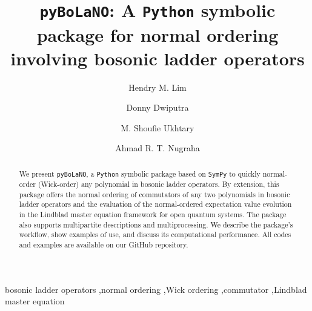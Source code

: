 \documentclass[5p, twocolumn, 10pt, sort&compress]{elsarticle}
\newcounter{bla}
\begin{document}
\sloppy

\begin{frontmatter}

\title{\texttt{pyBoLaNO}: A \texttt{Python} symbolic package for normal ordering involving bosonic ladder operators}

\author[a,b]{Hendry M. Lim}
\author[c,a]{Donny Dwiputra}
\author[a]{M. Shoufie Ukhtary}
\author[a,d]{Ahmad R. T. Nugraha}

\address[a]{Research Center for Quantum Physics, National Research and Innovation Agency (BRIN), South Tangerang 15314, Indonesia}
\address[b]{Department of Physics, Faculty of Mathematics and Natural Sciences, Universitas Indonesia, Depok 16424, Indonesia}
\address[c]{Asia Pacific Center for Theoretical Physics, Pohang 37673, Korea}
\address[d]{Department of Engineering Physics, Telkom University, Bandung 40257, Indonesia}


\begin{abstract}
We present \texttt{pyBoLaNO}, a \texttt{Python} symbolic package based on \texttt{SymPy} to quickly normal-order (Wick-order) any polynomial in bosonic ladder operators. By extension, this package offers the normal ordering of commutators of any two polynomials in bosonic ladder operators and the evaluation of the normal-ordered expectation value evolution in the Lindblad master equation framework for open quantum systems. The package also supports multipartite descriptions and multiprocessing. We describe the package's workflow, show examples of use, and discuss its computational performance. All codes and examples are available on our GitHub repository.
\end{abstract}


\begin{keyword}
bosonic ladder operators \sep normal ordering \sep Wick ordering \sep commutator \sep Lindblad master equation

\end{keyword}

\end{frontmatter}
\end{document}
